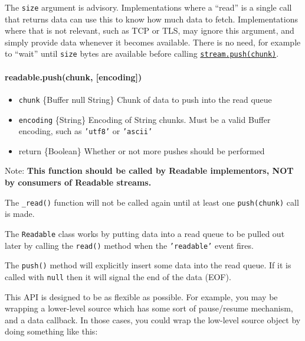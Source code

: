 The \texttt{size} argument is advisory. Implementations where a ``read''
is a single call that returns data can use this to know how much data to
fetch. Implementations where that is not relevant, such as TCP or TLS,
may ignore this argument, and simply provide data whenever it becomes
available. There is no need, for example to ``wait'' until \texttt{size}
bytes are available before calling
\hyperref[stream\_readable\_push\_chunk\_encoding]{\texttt{stream.push(chunk)}}.

\paragraph{readable.push(chunk, {[}encoding{]})}

\begin{itemize}
\item
  \texttt{chunk} \{Buffer \textbar{} null \textbar{} String\} Chunk of
  data to push into the read queue
\item
  \texttt{encoding} \{String\} Encoding of String chunks. Must be a
  valid Buffer encoding, such as \texttt{'utf8'} or \texttt{'ascii'}
\item
  return \{Boolean\} Whether or not more pushes should be performed
\end{itemize}

Note: \textbf{This function should be called by Readable implementors,
NOT by consumers of Readable streams.}

The \texttt{\_read()} function will not be called again until at least
one \texttt{push(chunk)} call is made.

The \texttt{Readable} class works by putting data into a read queue to
be pulled out later by calling the \texttt{read()} method when the
\texttt{'readable'} event fires.

The \texttt{push()} method will explicitly insert some data into the
read queue. If it is called with \texttt{null} then it will signal the
end of the data (EOF).

This API is designed to be as flexible as possible. For example, you may
be wrapping a lower-level source which has some sort of pause/resume
mechanism, and a data callback. In those cases, you could wrap the
low-level source object by doing something like this:

